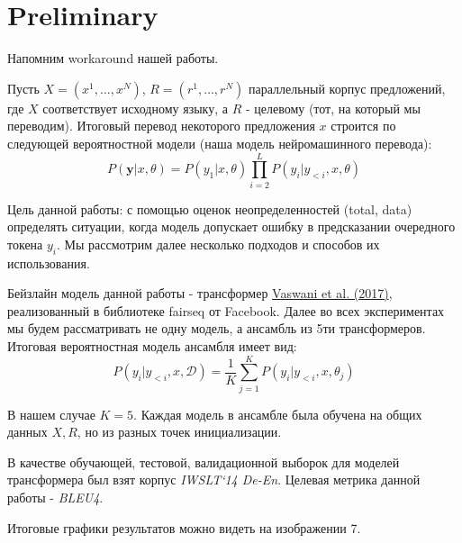 \documentclass[a4paper,14pt]{extarticle}
\newcommand{\bibref}[3]{\hyperlink{#1}{#2 (#3)}}
\begin{document}
\section{Preliminary}
	Напомним workaround нашей работы.
	
	Пусть $X = (x^1, \dots, x^N)$, $R = (r^1, \dots, r^N)$ параллельный корпус предложений, где $X$ соответствует исходному языку, а $R$ - целевому (тот, на который мы переводим). Итоговый перевод некоторого предложения $x$ строится по следующей вероятностной модели (наша модель нейромашинного перевода): 
	\begin{equation*}
		P(\textbf{y} | x, \theta) = P(y_1 | x, \theta) \prod_{i=2}^{L} P(y_i | y_{<i}, x, \theta)
	\end{equation*}
	
	Цель данной работы: с помощью оценок неопределенностей (total, data) определять ситуации, когда модель допускает ошибку в предсказании очередного токена $y_i$. Мы рассмотрим далее несколько подходов и способов их использования.
	
	Бейзлайн модель данной работы - трансформер \bibref{transformer}{Vaswani et al.}{2017}, реализованный в библиотеке fairseq от Facebook. Далее во всех экспериментах мы будем рассматривать не одну модель, а ансамбль из 5ти трансформеров. Итоговая вероятностная модель ансамбля имеет вид:
	\begin{equation*}
		P(y_i | y_{<i}, x, \mathcal{D}) = \frac1{K} \sum_{j=1}^{K}P(y_i | y_{<i}, x, \theta_j)
	\end{equation*}
	
	В нашем случае $K=5$. Каждая модель в ансамбле была обучена на общих данных $X, R$, но из разных точек инициализации.
	
	В качестве обучающей, тестовой, валидационной  выборок для моделей трансформера был взят корпус \textit{IWSLT`14 De-En}. Целевая метрика данной работы - \textit{BLEU4}.
	
	Итоговые графики результатов можно видеть на изображении 7.
	
	\begin{figure}[t]
	\end{figure}
	
\end{document}
